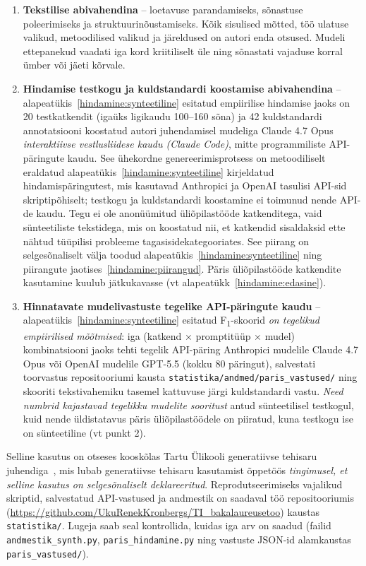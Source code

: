 \begin{enumerate}
    \item \textbf{Tekstilise abivahendina} -- loetavuse parandamiseks, sõnastuse poleerimiseks ja struktuurinõustamiseks. Kõik sisulised mõtted, töö ulatuse valikud, metoodilised valikud ja järeldused on autori enda otsused. Mudeli ettepanekud vaadati iga kord kriitiliselt üle ning sõnastati vajaduse korral ümber või jäeti kõrvale.
    \item \textbf{Hindamise testkogu ja kuldstandardi koostamise abivahendina} -- alapeatükis~\ref{hindamine:synteetiline} esitatud empiirilise hindamise jaoks on 20 testkatkendit (igaüks ligikaudu 100--160 sõna) ja 42 kuldstandardi annotatsiooni koostatud autori juhendamisel mudeliga Claude 4.7 Opus \emph{interaktiivse vestlusliidese kaudu (Claude Code)}, mitte programmiliste API-päringute kaudu. See ühekordne genereerimisprotsess on metoodiliselt eraldatud alapeatükis~\ref{hindamine:synteetiline} kirjeldatud hindamispäringutest, mis kasutavad Anthropici ja OpenAI tasulisi API-sid skriptipõhiselt; testkogu ja kuldstandardi koostamine ei toimunud nende API-de kaudu. Tegu ei ole anonüümitud üliõpilastööde katkenditega, vaid sünteetiliste tekstidega, mis on koostatud nii, et katkendid sisaldaksid ette nähtud tüüpilisi probleeme tagasisidekategooriates. See piirang on selgesõnaliselt välja toodud alapeatükis~\ref{hindamine:synteetiline} ning piirangute jaotises~\ref{hindamine:piirangud}. Päris üliõpilastööde katkendite kasutamine kuulub jätkukavasse (vt alapeatükk~\ref{hindamine:edasine}).
    \item \textbf{Hinnatavate mudelivastuste tegelike API-päringute kaudu} -- alapeatükis~\ref{hindamine:synteetiline} esitatud F\textsubscript{1}-skoorid \emph{on tegelikud empiirilised mõõtmised}: iga (katkend × promptitüüp × mudel) kombinatsiooni jaoks tehti tegelik API-päring Anthropici mudelile Claude 4.7 Opus või OpenAI mudelile GPT-5.5 (kokku 80 päringut), salvestati toorvastus repositooriumi kausta \texttt{statistika/andmed/paris\_vastused/} ning skooriti tekstivahemiku tasemel kattuvuse järgi kuldstandardi vastu. \emph{Need numbrid kajastavad tegelikku mudelite sooritust} antud sünteetilisel testkogul, kuid nende üldistatavus päris üliõpilastöödele on piiratud, kuna testkogu ise on sünteetiline (vt punkt 2).
\end{enumerate}

Selline kasutus on otseses kooskõlas Tartu Ülikooli generatiivse tehisaru juhendiga~\cite{ut_genAI_2024}, mis lubab generatiivse tehisaru kasutamist õppetöös \emph{tingimusel, et selline kasutus on selgesõnaliselt deklareeritud}. Reprodutseerimiseks vajalikud skriptid, salvestatud API-vastused ja andmestik on saadaval töö repositooriumis (\url{https://github.com/UkuRenekKronbergs/TI_bakalaureusetoo}) kaustas \texttt{statistika/}. Lugeja saab seal kontrollida, kuidas iga arv on saadud (failid \texttt{andmestik\_synth.py}, \texttt{paris\_hindamine.py} ning vastuste JSON-id alamkaustas \texttt{paris\_vastused/}).
